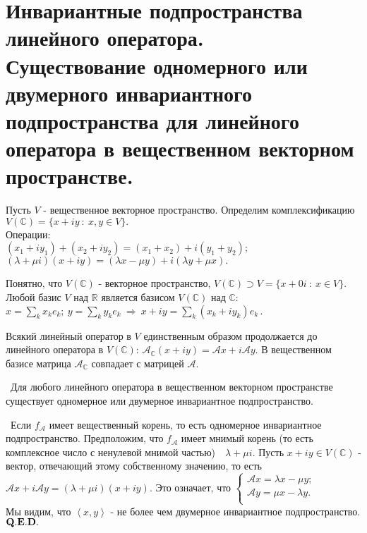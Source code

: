 \documentclass[a4paper]{article}%
\renewcommand{\c}{\mathbb{C}}
\renewcommand{\ab}{\par\noindent}%
\newcommand{\te}{\par\noindent{\bf Теорема.}\ }%
\newcommand{\dok}{\par\noindent{\textsl{Доказательство}.}\ }%
\newcommand{\qed}{\quad${{\bf Q.E.D.}}$}
\newcommand{\lob}[1]{\left\langle#1\right\rangle}%
\newcommand{\op}[1]{$\mathcal{#1}$}
\renewcommand{\om}[1]{\mathcal{#1}}
\begin{document}
\section{Инвариантные подпространства линейного оператора.\\ Существование одномерного или двумерного инвариантного подпространства
для линейного оператора в вещественном векторном пространстве.} %
\label{q27}%
Пусть $V$ - вещественное векторное пространство. Определим комплексификацию \\
$V(\c)=\{x+iy\ :\ x,y\in V\}.$ %
\\Операции:\\ $(x_1+iy_1)+(x_2+iy_2)=(x_1+x_2)+i(y_1+y_2);$
\\
$(\lambda+\mu i)(x+iy)=(\lambda x-\mu y)+i(\lambda y+\mu x).$ %
\ab Понятно, что $V(\c)$ - векторное пространство, $V(\c)\supset V=\{x+0i\ :\ x\in V\}.$ %
\\Любой базис $V$ над $\mathbb{R}$ является базисом $V(\c)$ над $\c$:\\
$x=\sum\limits_kx_ke_k;\ y=\sum\limits_ky_ke_k\ \Rightarrow\ x+iy=\sum\limits_k(x_k+iy_k)e_k\,.$ %
\ab Всякий линейный оператор в $V$ единственным образом продолжается до линейного оператора в $V(\c)$:
$\om{A_{\c}}(x+iy)=\om{A}x+i\om{A}y.$ В вещественном базисе матрица $\om{A}_{\c}$ совпадает с матрицей \op{A}. %
\te Для любого линейного оператора в вещественном векторном пространстве существует одномерное или двумерное
инвариантное подпространство. %
\dok Если $f_{\om{A}}$ имеет вещественный корень, то есть одномерное инвариантное подпространство.
Предположим, что $f_{\om{A}}$ имеет мнимый корень (то есть комплексное число с ненулевой мнимой частью)\ \ $\lambda+\mu i.$%
Пусть $x+iy\in V(\c)$ - вектор, отвечающий этому собственному значению, то есть $\om{A}x+i\om{A}y=(\lambda+\mu
i)(x+iy).$ Это означает, что $\left\{%
\begin{array}{ll}
    \om{A}x=\lambda x-\mu y; &  \\
    \om{A}y=\mu x-\lambda y. &  \\
\end{array}%
\right.$ %
\\Мы видим, что $\lob{x,y}$ - не более чем двумерное инвариантное подпространство.\qed
\end{document}
